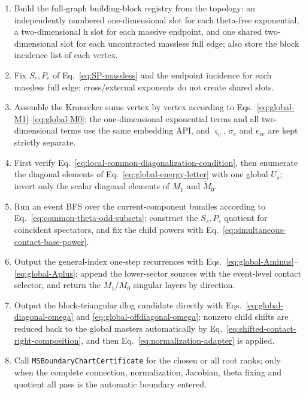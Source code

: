 \documentclass[11pt,a4paper]{article}
\begin{document}
\begin{enumerate}[label=\arabic*.]
  \item Build the full-graph building-block registry from the topology: an independently numbered one-dimensional slot for each theta-free exponential, a two-dimensional h slot for each massive endpoint, and one shared two-dimensional slot for each uncontracted massless full edge; also store the block incidence list of each vertex.
  \item Fix $S_e,P_e$ of Eq.~\eqref{eq:SP-massless} and the endpoint incidence for each massless full edge; cross/external exponents do not create shared slots.
  \item Assemble the Kronecker sums vertex by vertex according to Eqs.~\eqref{eq:global-M1}--\eqref{eq:global-M0}; the one-dimensional exponential terms and all two-dimensional terms use the same embedding API, and $\varsigma_v$, $\sigma_e$ and $\epsilon_{ve}$ are kept strictly separate.
  \item First verify Eq.~\eqref{eq:local-common-diagonalization-condition}, then enumerate the diagonal elements of Eq.~\eqref{eq:global-energy-letter} with one global $U_s$; invert only the scalar diagonal elements of $M_1$ and $\widetilde M_0$.
  \item Run an event BFS over the current-component bundles according to Eq.~\eqref{eq:common-theta-odd-subsets}; construct the $S_s,P_s$ quotient for coincident spectators, and fix the child powers with Eq.~\eqref{eq:simultaneous-contact-base-power}.
  \item Output the general-index one-step recurrences with Eqs.~\eqref{eq:global-Aminus}--\eqref{eq:global-Aplus}; append the lower-sector sources with the event-level contact selector, and return the $M_1/M_0$ singular layers by direction.
  \item Output the block-triangular dlog candidate directly with Eqs.~\eqref{eq:global-diagonal-omega} and \eqref{eq:global-offdiagonal-omega}; nonzero child shifts are reduced back to the global masters automatically by Eq.~\eqref{eq:shifted-contact-right-composition}, and then Eq.~\eqref{eq:normalization-adapter} is applied.
  \item Call \texttt{MSBoundaryChartCertificate} for the chosen or all root ranks; only when the complete connection, normalization, Jacobian, theta fixing and quotient all pass is the automatic boundary entered.
\end{enumerate}
\end{document}
